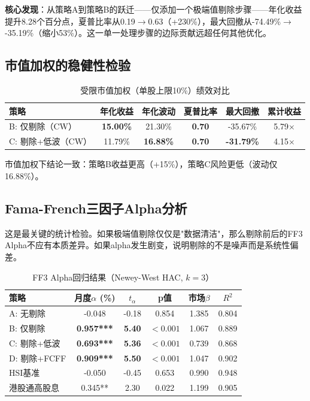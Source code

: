 \documentclass[10pt,a4paper]{ctexart}
\begin{document}
\textbf{核心发现}：从策略A到策略B的跃迁——仅添加一个极端值剔除步骤——年化收益提升8.28个百分点，夏普比率从0.19$\rightarrow$0.63（+230\%），最大回撤从-74.49\%$\rightarrow$-35.19\%（缩小53\%）。这一单一处理步骤的边际贡献远超任何其他优化。

\subsection{市值加权的稳健性检验}

\begin{table}[htbp]
\centering
\caption{受限市值加权（单股上限10\%）绩效对比}
\begin{tabular}{lccccc}
\toprule
\textbf{策略} & \textbf{年化收益} & \textbf{年化波动} & \textbf{夏普比率} & \textbf{最大回撤} & \textbf{累计收益} \\
\midrule
B: 仅剔除（CW） & \textbf{15.00\%} & 21.30\% & \textbf{0.70} & -35.67\% & 5.79$\times$ \\
C: 剔除+低波（CW） & 11.79\% & \textbf{16.88\%} & \textbf{0.70} & \textbf{-31.79\%} & 4.15$\times$ \\
\bottomrule
\end{tabular}
\end{table}

市值加权下结论一致：策略B收益更高（+15\%），策略C风险更低（波动仅16.88\%）。

\subsection{Fama-French三因子Alpha分析}

这是最关键的统计检验。如果极端值剔除仅仅是"数据清洁"，那么剔除前后的FF3 Alpha不应有本质差异。如果alpha发生剧变，说明剔除的不是噪声而是系统性偏差。

\begin{table}[htbp]
\centering
\caption{FF3 Alpha回归结果（Newey-West HAC, $k=3$）}
\begin{tabular}{lccccc}
\toprule
\textbf{策略} & \textbf{月度$\alpha$ (\%)} & \textbf{$t_{\alpha}$} & \textbf{p值} & \textbf{市场$\beta$} & \textbf{$R^2$} \\
\midrule
A: 无剔除 & -0.048 & -0.18 & 0.854 & 1.385 & 0.804 \\
B: 仅剔除 & \textbf{0.957***} & \textbf{5.40} & $<0.001$ & 1.067 & 0.889 \\
C: 剔除+低波 & \textbf{0.693***} & \textbf{5.36} & $<0.001$ & 0.739 & 0.868 \\
D: 剔除+FCFF & \textbf{0.909***} & \textbf{5.50} & $<0.001$ & 1.047 & 0.902 \\
\hline
HSI基准 & -0.050 & -0.45 & 0.653 & 0.990 & 0.948 \\
港股通高股息 & 0.345** & 2.30 & 0.022 & 1.199 & 0.905 \\
\bottomrule
\end{tabular}
\end{table}
\end{document}
